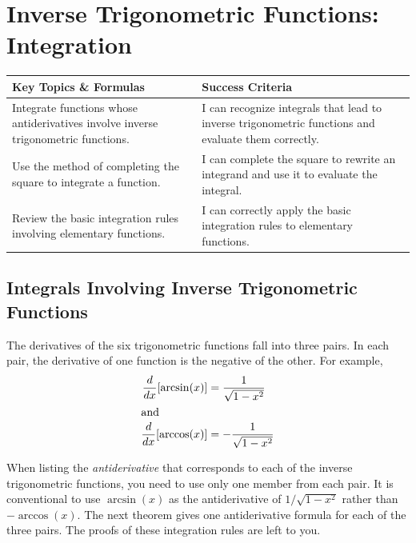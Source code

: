 \documentclass[12pt, letterpaper]{article}
\begin{document}
\section{Inverse Trigonometric Functions: Integration}
\begin{objectives}
    \renewcommand{\arraystretch}{1.5} %
    \begin{tabularx}{\textwidth}{@{} >{\raggedright\arraybackslash}X >{\raggedright\arraybackslash}X @{}}
        
        \textbf{Key Topics \& Formulas} & \textbf{Success Criteria} \\ 
        \midrule[1.5pt] %
        
        Integrate functions whose antiderivatives involve inverse trigonometric functions.
        & I can recognize integrals that lead to inverse trigonometric functions and evaluate them correctly. \\
        \midrule %
        
        Use the method of completing the square to integrate a function.
        & I can complete the square to rewrite an integrand and use it to evaluate the integral. \\
        \midrule

        Review the basic integration rules involving elementary functions.
        & I can correctly apply the basic integration rules to elementary functions.
    \end{tabularx}
\end{objectives}

\subsection{Integrals Involving Inverse Trigonometric Functions}
The derivatives of the six trigonometric functions fall into three pairs. In each pair, the derivative of one function is the negative of the other. For example,
\begin{align*}
    \displaystyle \frac{d}{dx} [\arcsin(x)] &= \frac{1}{\sqrt{1-x^2}} \\
    \intertext{and}
    \displaystyle \frac{d}{dx} [\arccos(x)] &= -\frac{1}{\sqrt{1-x^2}} 
\end{align*}

When listing the \textit{antiderivative}  that corresponds to each of the inverse trigonometric functions, you need to use only one member from each pair. It is conventional to use $\arcsin(x)$ as the antiderivative of $1/\sqrt{1-x^2}$ rather than $-\arccos(x)$. The next theorem gives one antiderivative formula for each of the three pairs. The proofs of these integration rules are left to you. 
\end{document}
